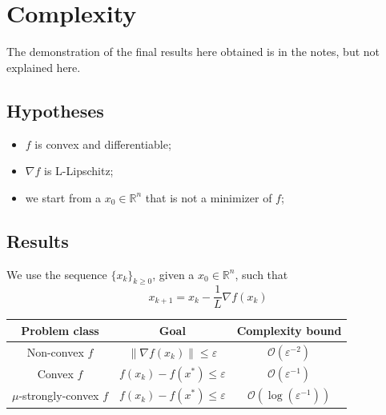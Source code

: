 \documentclass[12pt, openany]{report}
\begin{document}
\section{Complexity}
The demonstration of the final results here obtained is in the notes, but not explained here. 
\subsection{Hypotheses}
\begin{itemize}
    \item \(f\) is convex and differentiable;
    \item \(\nabla f\) is L-Lipschitz;
    \item we start from a \(x_0\in \mathbb{R}^n\) that is not a minimizer of \(f\);
\end{itemize}
\subsection{Results}
We use the sequence \(\{x_k\}_{k\ge 0}\), given a \(x_0\in \mathbb{R}^n\), such that \[x_{k+1} = x_k - \frac{1}{L}\nabla f(x_k)\]
\begin{center}
    \begin{tabular}{c|c|c}
    Problem class & Goal & Complexity bound \\ \hline\hline
    Non-convex \(f\) & \(\lVert \nabla f(x_k)\rVert \le \varepsilon\) & \(\mathcal{O}(\varepsilon^{-2})\)\\ \hline
    Convex \(f\) & \(f(x_k)-f(x^*)\le \varepsilon\) & \(\mathcal{O}(\varepsilon^{-1})\)\\ \hline
    \(\mu\)-strongly-convex \(f\) & \(f(x_k)-f(x^*)\le \varepsilon\) & \(\mathcal{O}(\log (\varepsilon^{-1}))\)
\end{tabular}
\end{center}
\end{document}
